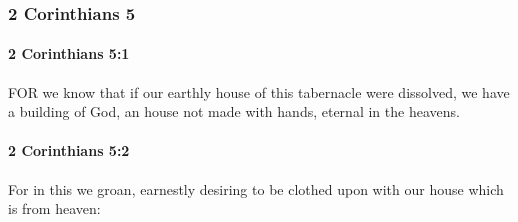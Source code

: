 	\subsubsection{2 Corinthians 5} %
		\label{2CORINTHIANS-5}
		
		\paragraph{2 Corinthians 5:1} %
			\label{2CORINTHIANS-5-1}

			FOR we know that if our earthly house of this tabernacle were dissolved, we have a building of God, an house not made with hands, eternal in the heavens.

			\begin{framed}
			\scriptsize
				\begin{compactdesc}
					\item[SBLG] 
				\end{compactdesc}
			\end{framed}

		\paragraph{2 Corinthians 5:2} %
			\label{2CORINTHIANS-5-2}

			For in this we groan, earnestly desiring to be clothed upon with our house which is from heaven:

